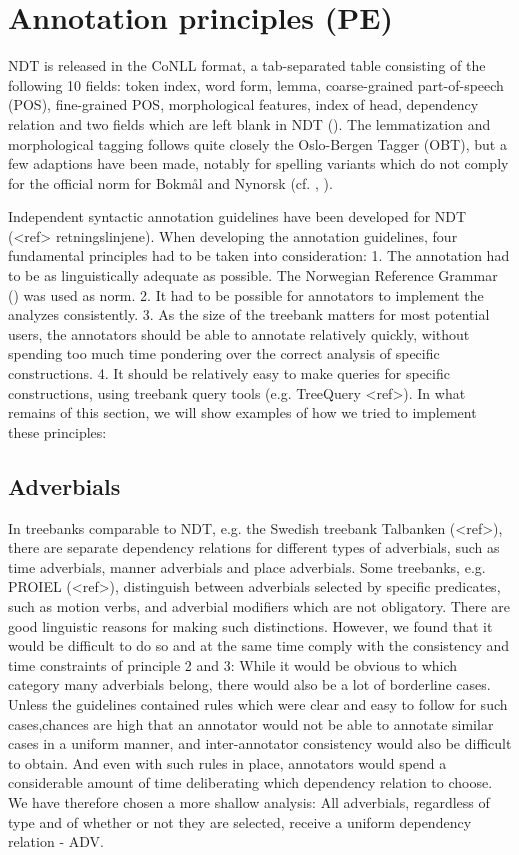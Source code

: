 \documentclass[11pt,a4paper]{article}
\begin{document}

\section{Annotation principles (PE)}
NDT is released in the CoNLL format, a tab-separated table consisting of the following 10 fields: token index, word form, lemma, coarse-grained part-of-speech (POS), fine-grained POS, morphological features, index of head, dependency relation and two fields which are left blank in NDT (\cite{Niv:Hal:Kub:07}). The lemmatization and morphological tagging follows quite closely the Oslo-Bergen Tagger (OBT), but a few adaptions have been made, notably for spelling variants which do not comply for the official norm for Bokmål and Nynorsk (cf. \cite{Joh:Hag:No:Lyn:2011}, \cite{Sol:2013}).


Independent syntactic annotation guidelines have been developed for NDT (<ref> retningslinjene). When developing the annotation guidelines, four fundamental principles had to be taken into consideration: 1. The annotation had to be as linguistically adequate as possible. The Norwegian Reference Grammar (\cite{Faa:Lie:Van:97}) was used as norm. 2. It had to be possible for annotators to implement the analyzes consistently. 3. As the size of the treebank matters for most potential users, the annotators should be able to annotate relatively quickly, without spending too much time pondering over the correct analysis of specific constructions. 4. It should be relatively easy to make queries for specific constructions, using treebank query tools (e.g. TreeQuery <ref>). In what remains of this section, we will show examples of how we tried to implement these principles:

\subsection{Adverbials}
In treebanks comparable to NDT, e.g. the Swedish treebank Talbanken (<ref>), there are separate dependency relations for different types of adverbials, such as time adverbials, manner adverbials and place adverbials. Some treebanks, e.g. PROIEL (<ref>), distinguish between adverbials selected by specific predicates, such as motion verbs, and adverbial modifiers which are not obligatory. There are good linguistic reasons for making such distinctions. However, we found that it would be difficult to do so and at the same time comply with the consistency and time constraints of principle 2 and 3: While it would be obvious to which category many adverbials belong, there would also be a lot of borderline cases. Unless the guidelines contained rules which were clear and easy to follow for such cases,chances are high that an annotator would not be able to annotate similar cases in a uniform manner, and inter-annotator consistency would also be difficult to obtain. And even with such rules in place, annotators would spend a considerable amount of time deliberating which dependency relation to choose. We have therefore chosen a more shallow analysis: All adverbials, regardless of type and of whether or not they are selected, receive a uniform dependency relation - ADV.
\end{document}
